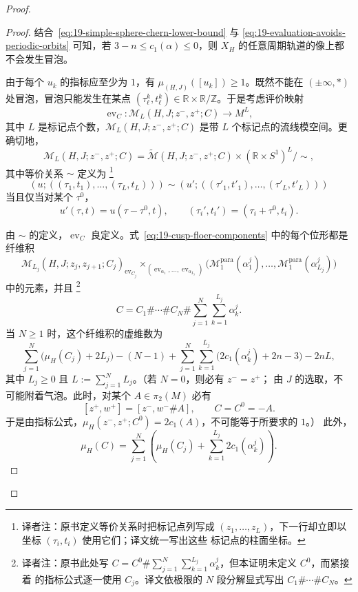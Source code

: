 \begin{proof}
\begin{proof}
结合~\eqref{eq:19-simple-sphere-chern-lower-bound} 与
\eqref{eq:19-evaluation-avoids-periodic-orbits} 可知，若
$3-n\leq c_1(\alpha)\leq0$，则 $X_H$ 的任意周期轨道的像上都不会发生冒泡。

由于每个 $u_k$ 的指标应至少为 $1$，有 $\mu_{(H,J)}([u_k])\geq1$。既然不能在
$(\pm\infty,*)$ 处冒泡，冒泡只能发生在某点
$(\tau_\ell^k,t_\ell^k)\in\mathbb R\times\mathbb R/\mathbb Z$。于是考虑评价映射
\[
 \operatorname{ev}_C:\mathcal M_L(H,J;z^-,z^+;C)\longrightarrow M^L,
\]
其中 $L$ 是标记点个数，$\mathcal M_L(H,J;z^-,z^+;C)$ 是带 $L$ 个标记点的\personFloer{}流线模空间。更确切地，
\[
 \mathcal M_L(H,J;z^-,z^+;C)
 =\widetilde{\mathcal M}(H,J;z^-,z^+;C)
 \times(\mathbb R\times S^1)^L/\sim,
\]
其中等价关系 $\sim$ 定义为
\footnote{译者注：原书定义等价关系时把标记点列写成
$(z_1,\ldots,z_L)$，下一行却立即以坐标 $(\tau_i,t_i)$ 使用它们；译文统一写出这些
标记点的柱面坐标。}
\[
 (u;((\tau_1,t_1),\ldots,(\tau_L,t_L)))
 \sim(u';((\tau'_1,t'_1),\ldots,(\tau'_L,t'_L)))
\]
当且仅当对某个 $\tau^0$，
\[
 u'(\tau,t)=u(\tau-\tau^0,t),\qquad
 (\tau_i',t_i')=(\tau_i+\tau^0,t_i).
\]

由 $\sim$ 的定义，$\operatorname{ev}_C$ 良定义。式~\eqref{eq:19-cusp-floer-components}
中的每个位形都是纤维积
\[
 \mathcal M_{L_j}(H,J;z_j,z_{j+1};C_j)_{\operatorname{ev}_{C_j}}
 \!\times_{(\operatorname{ev}_{\alpha_1},\ldots,
 \operatorname{ev}_{\alpha_{L_j}})}
 \bigl(\mathcal M_1^{\mathrm{para}}(\alpha_1^j),\ldots,
 \mathcal M_1^{\mathrm{para}}(\alpha_{L_j}^j)\bigr)
\]
中的元素，并且
\footnote{译者注：原书此处写
$C=C^0\#\sum_{j=1}^N\sum_{k=1}^{L_j}\alpha_k^j$，但本证明未定义 $C^0$，而紧接着
的指标公式逐一使用 $C_j$。译文依极限的 $N$ 段分解显式写出
$C_1\#\cdots\#C_N$。}
\[
 C=C_1\#\cdots\#C_N\#
 \sum_{j=1}^{N}\sum_{k=1}^{L_j}\alpha_k^j.
\]
当 $N\geq1$ 时，这个纤维积的虚维数为
\begin{equation}
 \sum_{j=1}^{N}\bigl(\mu_H(C_j)+2L_j\bigr)-(N-1)
 +\sum_{j=1}^{N}\sum_{k=1}^{L_j}
 \bigl(2c_1(\alpha_k^j)+2n-3\bigr)-2nL,
\label{eq:19-bubbled-stratum-virtual-dimension}
\end{equation}
其中 $L_j\geq0$ 且 $L:=\sum_{j=1}^{N}L_j$。（若 $N=0$，则必有 $z^-=z^+$；
由 $J$ 的选取，不可能附着气泡。此时，对某个 $A\in\pi_2(M)$ 必有
\[
 [z^+,w^+]=[z^-,w^-\#A],\qquad C=C^0=-A.
\]
于是由指标公式，$\mu_H(z^-,z^+;C^0)=2c_1(A)$，不可能等于所要求的 $1$。）
此外，
\begin{equation}
 \mu_H(C)=\sum_{j=1}^{N}
 \left(\mu_H(C_j)+\sum_{k=1}^{L_j}2c_1(\alpha_k^j)\right).
\label{eq:19-total-index-bubble-decomposition}
\end{equation}


\end{proof}
\end{proof}
